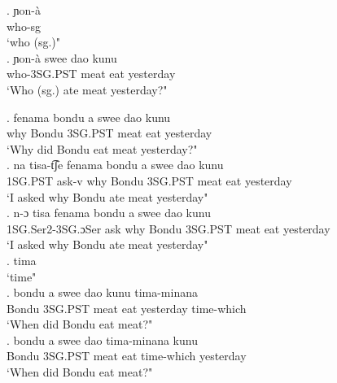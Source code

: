 \documentclass{assets/fieldnotes}
\begin{document}
{

\exg. ɲon-à\\
who-sg\\
    `who (sg.)" \\

\exg. ɲon-à swee dao kunu\\
who-3SG.PST meat eat yesterday\\
    `Who (sg.) ate meat yesterday?"\\

    

\exg. fenama bondu a swee dao kunu\\
why Bondu 3SG.PST meat eat yesterday\\
    `Why did Bondu eat meat yesterday?"\\

\exg. na tisa-t͡ʃe fenama bondu a swee dao kunu\\
1SG.PST ask-v why Bondu 3SG.PST meat eat yesterday\\
    `I asked why Bondu ate meat yesterday" \\

\exg. n-ɔ tisa fenama bondu a swee dao kunu\\
1SG.Ser2-3SG.ɔSer ask why Bondu 3SG.PST meat eat yesterday\\
    `I asked why Bondu ate meat yesterday" \\

\exg. tima\\
    `time"\\

\exg. bondu a swee dao kunu tima-minana\\
Bondu 3SG.PST meat eat yesterday time-which\\
    `When did Bondu eat meat?"\\

\exg. bondu a swee dao tima-minana kunu\\
Bondu 3SG.PST meat eat time-which yesterday\\
    `When did Bondu eat meat?"\\

}
\end{document}
